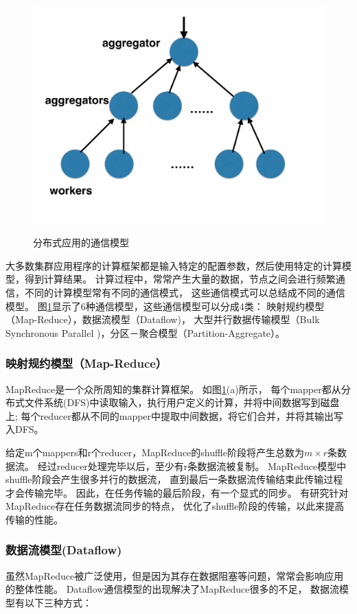 \begin{figure}[h]
      {\includegraphics[width=0.48\columnwidth]{figures/others/partition-aggregate.pdf}}
  \caption{分布式应用的通信模型}
  \label{relatedwork-communication-fig}
\end{figure}


大多数集群应用程序的计算框架都是输入特定的配置参数，然后使用特定的计算模型，得到计算结果。
计算过程中，常常产生大量的数据，节点之间会进行频繁通信，不同的计算模型常有不同的通信模式，
这些通信模式可以总结成不同的通信模型。
图\ref{relatedwork-communication-fig}显示了6种通信模型，这些通信模型可以分成4类：
映射规约模型（Map-Reduce），数据流模型（Dataflow)，
大型并行数据传输模型（Bulk Synchronous Parallel )，分区－聚合模型（Partition-Aggregate）。

\subsubsection{映射规约模型（Map-Reduce）}
MapReduce\cite{Dean2004Simplified}是一个众所周知的集群计算框架。
如图\ref{relatedwork-communication-fig}(a)所示，
每个mapper都从分布式文件系统(DFS)中读取输入，执行用户定义的计算，并将中间数据写到磁盘上;
每个reducer都从不同的mapper中提取中间数据，将它们合并，并将其输出写入DFS。

给定m个mappers和r个reducer，MapReduce的shuffle阶段将产生总数为$m\times r$条数据流。
经过reducer处理完毕以后，至少有r条数据流被复制。
MapReduce模型中shuffle阶段会产生很多并行的数据流，
直到最后一条数据流传输结束此传输过程才会传输完毕。
因此，在任务传输的最后阶段，有一个显式的同步。
有研究\cite{Chowdhury2011Managing}针对MapReduce存在任务数据流同步的特点，
优化了shuffle阶段的传输，以此来提高传输的性能。

\subsubsection{数据流模型(Dataflow)}
虽然MapReduce被广泛使用，但是因为其存在数据阻塞等问题，常常会影响应用的整体性能。
Dataflow通信模型的出现解决了MapReduce很多的不足，
数据流模型有以下三种方式：

